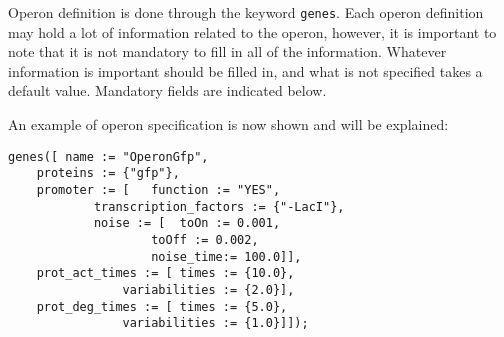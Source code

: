 \documentclass[10pt,a4paper]{article}
\begin{document}
Operon definition is done through the keyword \texttt{genes}. Each operon definition may hold a lot of information related to the operon, however, it is important to note that it is not mandatory to fill in all of the information. Whatever information is important should be filled in, and what is not specified takes a default value. Mandatory fields are indicated below. \newpage

An example of operon specification is now shown and will be explained:

\begin{Verbatim}[obeytabs]
genes([	name := "OperonGfp",
	proteins := {"gfp"},
	promoter := [	function := "YES", 
			transcription_factors := {"-LacI"},
			noise := [ 	toOn := 0.001, 
					toOff := 0.002,
					noise_time:= 100.0]],
	prot_act_times := [	times := {10.0},
				variabilities := {2.0}],
	prot_deg_times := [	times := {5.0},
				variabilities := {1.0}]]);
\end{Verbatim}
\end{document}
